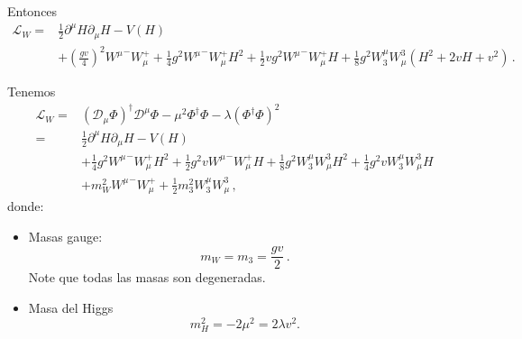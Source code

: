 Entonces
\begin{align}
  \label{eq:96qftm}
  \mathcal{L}_{W}=&\frac{1}{2}\partial^\mu H\partial_\mu H-V(H)\nonumber\\
  &+\left(\frac{gv}{4}\right)^2{W^\mu}^-W_\mu^++\frac{1}{4}g^2{W^\mu}^-W_\mu^+H^2+\frac{1}{2}vg^2{W^\mu}^-W_\mu^+H+\frac{1}{8}g^2 W_3^\mu W^3_\mu\left(H^2+2vH+v^2\right)\,.
\end{align}
\begin{frame}
Tenemos
\begin{align}
  \label{eq:lwbhfinm}
  \mathcal{L}_{W}=&\left( \mathcal{D}_\mu{\Phi} \right)^{\dagger}\mathcal{D}^\mu\Phi-\mu^2\Phi^{\dagger}\Phi-\lambda \left( \Phi^{\dagger}\Phi \right)^2 \nonumber\\
  =&\frac{1}{2}\partial^\mu H\partial_\mu H-V(H)\nonumber\\
&+\frac{1}{4}g^2{W^\mu}^-W_\mu^+H^2+\frac{1}{2}g^2v{W^\mu}^-W_\mu^+H
  +\frac{1}{8}g^2 W_3^\mu W^3_\mu H^2+\frac{1}{4}g^2v W_3^\mu W^3_\mu H\nonumber\\
  &+m_W^2{W^\mu}^-W_\mu^+ +\frac{1}{2}m_3^2W_3^\mu W^3_\mu\,,
\end{align}
donde:
\begin{itemize} %
\item Masas gauge:
\begin{equation}
  m_W=m_3=\frac{gv}{2}\,.
\end{equation}
Note que todas las masas son degeneradas.
\item Masa del Higgs
\begin{equation}
  m_H^2=-2\mu^2=2\lambda v^2.
\end{equation}
\end{itemize} %
\end{frame}


